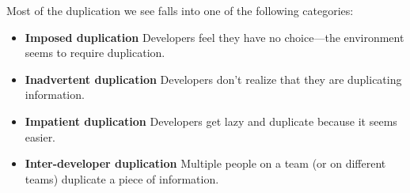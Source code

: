 Most of the duplication we see falls into one of the following categories:

\begin{itemize}
    \item \textbf{Imposed duplication} Developers feel they have no choice—the environment seems to require duplication.
    \item \textbf{Inadvertent duplication}  Developers don’t realize that they are duplicating information.
    \item \textbf{Impatient duplication}  Developers get lazy and duplicate because it seems easier.  
    \item \textbf{Inter-developer duplication}  Multiple people on a team (or on different
teams) duplicate a piece of information.
\end{itemize}
